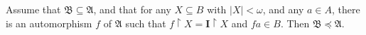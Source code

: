 Assume that $\mathfrak{B} \subseteq \mathfrak{A}$, and that for any $X \subseteq B$ with $|X| < \omega$, and any $a \in A$, there is an automorphism $f$ of $\mathfrak{A}$ such that $f \upharpoonright X = \mathbf{I} \upharpoonright X$ and $f a \in B$. Then $\mathfrak{B} \preceq \mathfrak{A}$.
